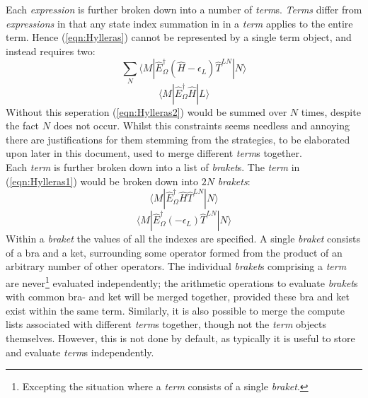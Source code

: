 \noindent Each \emph{expression} is further broken down into a number of \emph{term}s.
\emph{Terms} differ from \emph{expressions} in that any state index summation in
in a \emph{term} applies to the entire term.
Hence (\ref{eqn:Hylleras}) cannot be represented by a single term object, and instead
requires two:
\begin{equation}
\sum_{N} 
\langle M | \hat{E}^{\dagger}_{\Omega} (\hat{H}-\epsilon_{L}) \hat{T}^{LN} | N \rangle  
\label{eqn:Hylleras1}
\end{equation}
\begin{equation}
\langle M | \hat{E}^{\dagger}_{\Omega} \hat{H} | L  \rangle  
\label{eqn:Hylleras2}
\end{equation}
\noindent Without this seperation (\ref{eqn:Hylleras2}) would be summed over $N$ times,
despite the fact $N$ does not occur. 
Whilst this constraints seems needless and annoying there are justifications for them stemming
from the strategies, to be elaborated upon later in this document, used to merge different \emph{term}s together. \\ 

\noindent Each \emph{term} is further broken down into a list of \emph{braket}s. The \emph{term} 
in (\ref{eqn:Hylleras1}) would be broken down into $2N$ \emph{brakets}: 
\begin{equation}
\langle M | \hat{E}^{\dagger}_{\Omega} \hat{H} \hat{T}^{LN} | N \rangle  
\end{equation}
\begin{equation}
\langle M | \hat{E}^{\dagger}_{\Omega} (-\epsilon_{L}) \hat{T}^{LN} | N \rangle  
\end{equation}
\noindent Within a \emph{braket} the values of all the indexes are specified.
A single \emph{braket} consists of a bra and a ket, surrounding some operator
formed from the product of an arbitrary number of other operators.  The
individual \emph{braket}s comprising a \emph{term} are never\footnote{Excepting
the situation where a \emph{term} consists of a single \emph{braket}.}
evaluated independently; the arithmetic operations to evaluate \emph{braket}s
with common bra- and ket will be merged together, provided these bra and ket
exist within the same term. Similarly, it is also possible to merge the compute
lists associated with different \emph{term}s together, though not the
\emph{term} objects themselves. However, this is not done by default, as
typically it is useful to store and evaluate \emph{term}s independently.\\

